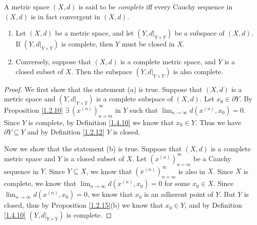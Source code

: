 \begin{definition}\label{1.4.10}
    A metric space \((X, d)\) is said to be \emph{complete} iff every Cauchy sequence in \((X, d)\) is in fact convergent in \((X, d)\).
\end{definition}

\setcounter{theorem}{11}
\begin{proposition}\label{1.4.12}
    \begin{enumerate}
        \item Let \((X, d)\) be a metric space, and let \((Y, d|_{Y \times Y})\) be a subspace of \((X, d)\).
              If \((Y, d|_{Y \times Y})\) is complete, then \(Y\) must be closed in \(X\).
        \item Conversely, suppose that \((X, d)\) is a complete metric space, and \(Y\) is a closed subset of \(X\).
              Then the subspace \((Y, d|_{Y \times Y})\) is also complete.
    \end{enumerate}
\end{proposition}

\begin{proof}
    We first show that the statement (a) is true.
    Suppose that \((X, d)\) is a metric space and \((Y, d|_{Y \times Y})\) is a complete subspace of \((X, d)\).
    Let \(x_0 \in \partial Y\).
    By Proposition \ref{1.2.10} \(\exists\ (x^{(n)})_{n = m}^\infty\) in \(Y\) such that \(\lim_{n \to \infty} d(x^{(n)}, x_0) = 0\).
    Since \(Y\) is complete, by Definition \ref{1.4.10} we know that \(x_0 \in Y\).
    Thus we have \(\partial Y \subseteq Y\) and by Definition \ref{1.2.12} \(Y\) is closed.

    Now we show that the statement (b) is true.
    Suppose that \((X, d)\) is a complete metric space and \(Y\) is a closed subset of \(X\).
    Let \((x^{(n)})_{n = m}^\infty\) be a Cauchy sequence in \(Y\).
    Since \(Y \subseteq X\), we know that \((x^{(n)})_{n = m}^\infty\) is also in \(X\).
    Since \(X\) is complete, we know that \(\lim_{n \to \infty} d(x^{(n)}, x_0) = 0\) for some \(x_0 \in X\).
    Since \(\lim_{n \to \infty} d(x^{(n)}, x_0) = 0\), we know that \(x_0\) is an adherent point of \(Y\).
    But \(Y\) is closed, thus by Proposition \ref{1.2.15}(b) we know that \(x_0 \in Y\), and by Definition \ref{1.4.10} \((Y, d|_{Y \times Y})\) is complete.
\end{proof}